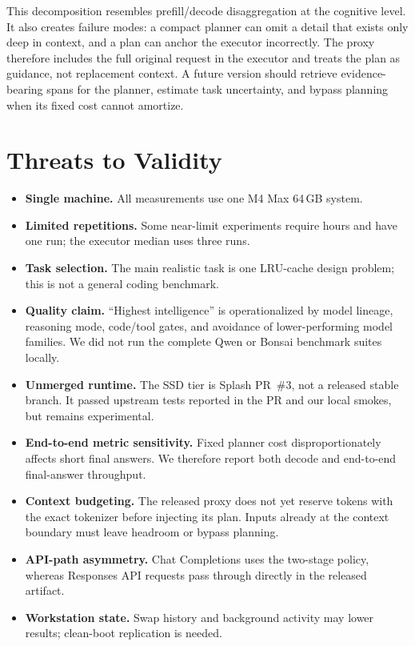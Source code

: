 \documentclass[11pt]{article}
\begin{document}
This decomposition resembles prefill/decode disaggregation at the cognitive level. It also creates failure modes: a compact planner can omit a detail that exists only deep in context, and a plan can anchor the executor incorrectly. The proxy therefore includes the full original request in the executor and treats the plan as guidance, not replacement context. A future version should retrieve evidence-bearing spans for the planner, estimate task uncertainty, and bypass planning when its fixed cost cannot amortize.

\section{Threats to Validity}
\begin{itemize}[leftmargin=1.6em]
\item \textbf{Single machine.} All measurements use one M4 Max 64\,GB system.
\item \textbf{Limited repetitions.} Some near-limit experiments require hours and have one run; the executor median uses three runs.
\item \textbf{Task selection.} The main realistic task is one LRU-cache design problem; this is not a general coding benchmark.
\item \textbf{Quality claim.} ``Highest intelligence'' is operationalized by model lineage, reasoning mode, code/tool gates, and avoidance of lower-performing model families. We did not run the complete Qwen or Bonsai benchmark suites locally.
\item \textbf{Unmerged runtime.} The SSD tier is Splash PR~\#3, not a released stable branch. It passed upstream tests reported in the PR and our local smokes, but remains experimental.
\item \textbf{End-to-end metric sensitivity.} Fixed planner cost disproportionately affects short final answers. We therefore report both decode and end-to-end final-answer throughput.
\item \textbf{Context budgeting.} The released proxy does not yet reserve tokens with the exact tokenizer before injecting its plan. Inputs already at the context boundary must leave headroom or bypass planning.
\item \textbf{API-path asymmetry.} Chat Completions uses the two-stage policy, whereas Responses API requests pass through directly in the released artifact.
\item \textbf{Workstation state.} Swap history and background activity may lower results; clean-boot replication is needed.
\end{itemize}
\end{document}
